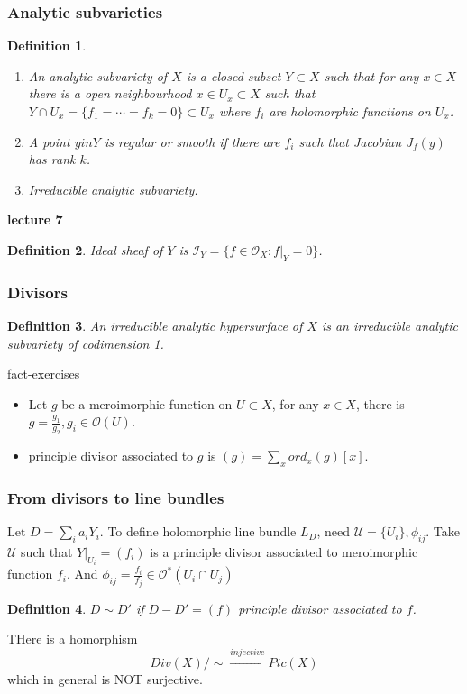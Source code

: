 \documentclass{article}
\newtheorem{definition}{Definition}[subsection]
\begin{document}
\subsubsection{Analytic subvarieties}
\begin{definition}
  \begin{enumerate}
    \item An analytic subvariety of $X$ is a closed subset $ Y \subset X $ such that for any $ x \in X $ there is a open neighbourhood $ x\in U_{x} \subset X $ such that $ Y \cap U_{x} = \{f_{1}=\cdots=f_{k}=0\} \subset U_{x}  $ where $f_{i}$ are holomorphic functions on  $ U_{x} $.
    \item A point $ y in Y $ is regular or smooth if there are $ f_{i} $ such that Jacobian $ J_{f}(y) $ has rank $k$. 
    \item Irreducible analytic subvariety.
  \end{enumerate}
\end{definition}

\textbf{lecture 7}
\begin{definition}
  Ideal sheaf of $Y$ is $ \mathcal{I}_{Y}=\{ f\in \mathcal{O}_{X}: f|_{Y}=0 \} $.
\end{definition}
\subsubsection{Divisors}
\begin{definition}
  An irreducible analytic hypersurface of $X$ is an irreducible analytic subvariety of codimension 1.
\end{definition}
fact-exercises
\begin{itemize}
  \item Let $g$ be a meroimorphic function on $U \subset X$, for any  $ x \in X $, there is $ g= \frac{g_{1}}{g_{2}},g_{i}\in \mathcal{O}(U) $.  
  \item principle divisor associated to $g$ is $ (g)=\sum_{x} ord_{x}(g) [x] $.
\end{itemize}

\subsubsection{From divisors to line bundles}
Let $D= \sum_{i}a_{i}Y_{i}$. To define holomorphic line bundle $L_{D}$, need  $ \mathcal{U}=\{U_{i}\}, \phi_{ij} $. Take $ \mathcal{U} $ such that $ Y|_{U_{i}}=(f_{i}) $ is a principle divisor associated to meroimorphic function $f_{i}$. And $ \phi_{ij}= \frac{f_{i}}{f_{j}} \in \mathcal{O}^{*}(U_{i} \cap U_{j}) $ 
\begin{definition}
  $ D \sim D' $ if $ D-D'=(f) $ principle divisor associated to $f$. 
\end{definition}
THere is a homorphism
\[
  Div(X)/\sim \xrightarrow{injective} Pic(X)
\]
which in general is NOT surjective.
\end{document}
